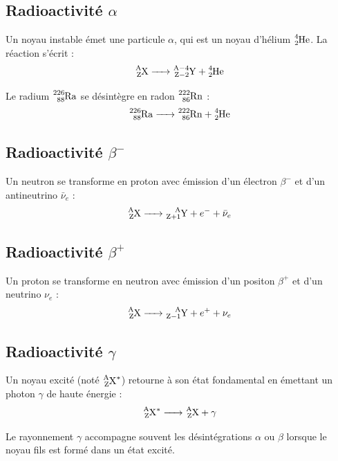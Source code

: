 \subsection{Radioactivité $\alpha$}
\begin{definition}
Un noyau instable émet une particule $\alpha$, qui est un noyau d'hélium $\ce{^{4}_{2}He}$. La réaction s'écrit :
\[\ce{^{A}_{Z}X -> ^{A-4}_{Z-2}Y + ^{4}_{2}He}\]
\end{definition}
\begin{exemple}
Le radium $\ce{^{226}_{88}Ra}$ se désintègre en radon $\ce{^{222}_{86}Rn}$ :
\[\ce{^{226}_{88}Ra -> ^{222}_{86}Rn + ^{4}_{2}He}\]
\end{exemple}

\subsection{Radioactivité $\beta^-$}
\begin{definition}
Un neutron se transforme en proton avec émission d'un électron $\beta^-$ et d'un antineutrino $\bar{\nu}_e$ :
\[\ce{^{A}_{Z}X -> ^{A}_{Z+1}Y} + e^- + \bar{\nu}_e\]
\end{definition}

\subsection{Radioactivité $\beta^+$}
\begin{definition}
Un proton se transforme en neutron avec émission d'un positon $\beta^+$ et d'un neutrino $\nu_e$ :
\[\ce{^{A}_{Z}X -> ^{A}_{Z-1}Y} + e^+ + \nu_e\]
\end{definition}

\subsection{Radioactivité $\gamma$}
\begin{definition}
Un noyau excité (noté $\ce{^{A}_{Z}X^*}$) retourne à son état fondamental en émettant un photon $\gamma$ de haute énergie :
\[\ce{^{A}_{Z}X^* -> ^{A}_{Z}X} + \gamma\]
\end{definition}
\begin{remarque}
Le rayonnement $\gamma$ accompagne souvent les désintégrations $\alpha$ ou $\beta$ lorsque le noyau fils est formé dans un état excité.
\end{remarque}

